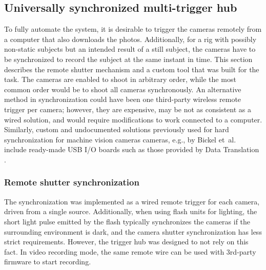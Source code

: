 
\subsection{Universally synchronized multi-trigger hub} %

To fully automate the system, it is desirable to trigger the cameras remotely from a computer that also downloads the photos.
Additionally, for a rig with possibly non-static subjects but an intended result of a still subject, the cameras have to be synchronized to record the subject at the same instant in time.
This section describes the remote shutter mechanism and a custom tool that was built for the task.
The cameras are enabled to shoot in arbitrary order, while the most common order would be to shoot all cameras synchronously.
An alternative method in synchronization could have been one third-party wireless remote trigger per camera;
however, they are expensive, may be not as consistent as a wired solution, and would require modifications to work connected to a computer.
Similarly, custom and undocumented solutions previously used for hard synchronization for machine vision cameras cameras, e.g., by Bickel et~al.\ \cite{bickel2007multi} include ready-made USB I/O boards such as those provided by Data Translation \cite{datatranslation}.

\subsubsection{Remote shutter synchronization} %

The synchronization was implemented as a wired remote trigger for each camera, driven from a single source.
Additionally, when using flash units for lighting, the short light pulse emitted by the flash typically synchronizes the cameras if the surrounding environment is dark, and the camera shutter synchronization has less strict requirements.
However, the trigger hub was designed to not rely on this fact.
In video recording mode, the same remote wire can be used with 3rd-party firmware to start recording.

